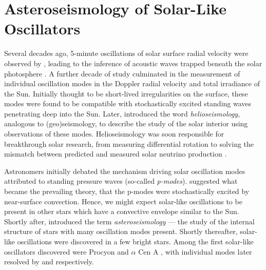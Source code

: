 %
%
%
%
%
\chapter[Asteroseismology]{Asteroseismology of Solar-Like Oscillators}

Several decades ago, 5-minute oscillations of solar surface radial velocity were observed by \citet{Leighton.Noyes.ea1962}, leading to the inference of acoustic waves trapped beneath the solar photosphere \citep{Ulrich1970}. A further decade of study culminated in the measurement of individual oscillation modes in the Doppler radial velocity \citep{Claverie.Isaak.ea1979} and total irradiance \citep{Woodard.Hudson1983a} of the Sun. Initially thought to be short-lived irregularities on the surface, these modes were found to be compatible with stochastically excited standing waves penetrating deep into the Sun. Later, \citet{Deubner.Gough1984} introduced the word \emph{helioseismology}, analogous to (geo)seismology, to describe the study of the solar interior using observations of these modes. Helioseismology was soon responsible for breakthrough solar research, from measuring differential rotation \citep{Deubner.Ulrich.ea1979} to solving the mismatch between predicted and measured solar neutrino production \citep{Bahcall.Ulrich1988}.

Astronomers initially debated the mechanism driving solar oscillation modes attributed to standing pressure waves (so-called \emph{p-modes}). \citet{Goldreich.Keeley1977} suggested what became the prevailing theory, that the p-modes were stochastically excited by near-surface convection. Hence, we might expect solar-like oscillations to be present in other stars which have a convective envelope similar to the Sun. Shortly after, \citet{Christensen-Dalsgaard1984} introduced the term \emph{asteroseismology} --- the study of the internal structure of stars with many oscillation modes present.  Shortly thereafter, solar-like oscillations were discovered in a few bright stars. Among the first solar-like oscillators discovered were Procyon and \(\alpha\) Cen A \citep{Gelly.Grec.ea1986}, with individual modes later resolved by \citet{Martic.Schmitt.ea1999} and \citet{Bouchy.Carrier2001} respectively.

